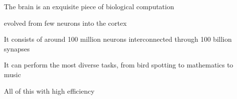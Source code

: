 The brain is an exquisite piece of biological computation

evolved from few neurons into the cortex

It consists of around 100 million neurons interconnected through 100 billion synapses

It can perform the most diverse tasks, from bird spotting to mathematics to music

All of this with high efficiency

